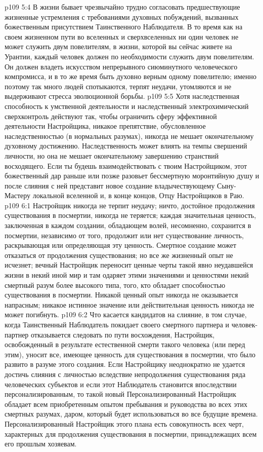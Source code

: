 \vs p109 5:4 \pc В жизни бывает чрезвычайно трудно согласовать предшествующие жизненные устремления с требованиями духовных побуждений, вызванных божественным присутствием Таинственного Наблюдателя. В то время как на своем жизненном пути во вселенных и сверхвселенных ни один человек не может служить двум повелителям, в жизни, которой вы сейчас живете на Урантии, каждый человек должен по необходимости служить двум повелителям. Он должен владеть искусством непрерывного сиюминутного человеческого компромисса, и в то же время быть духовно верным одному повелителю; именно поэтому так много людей спотыкаются, терпят неудачи, утомляются и не выдерживают стресса эволюционной борьбы.
\enlargethispage{\baselineskip}%
\vs p109 5:5 Хотя наследственная способность к умственной деятельности и наследственный электрохимический сверхконтроль действуют так, чтобы ограничить сферу эффективной деятельности Настройщика, никакое препятствие, обусловленное наследственностью (в нормальных разумах), никогда не мешает окончательному духовному достижению. Наследственность может влиять на темпы свершений личности, но она не мешает окончательному завершению странствий восходящего. Если ты будешь взаимодействовать с твоим Настройщиком, этот божественный дар раньше или позже разовьет бессмертную моронтийную душу и после слияния с ней представит новое создание владычествующему Сыну\hyp{}Мастеру локальной вселенной и, в конце концов, Отцу Настройщиков в Раю.
\vs p109 6:1 Настройщик никогда не терпит неудачу; ничто, достойное продолжения существования в посмертии, никогда не теряется; каждая значительная ценность, заключенная в каждом создании, обладающем волей, несомненно, сохранится в посмертии, независимо от того, продолжит или нет существование личность, раскрывающая или определяющая эту ценность. Смертное создание может отказаться от продолжения существования; но все же жизненный опыт не исчезнет; вечный Настройщик переносит ценные черты такой явно неудавшейся жизни в некий иной мир и там одаряет этими значениями и ценностями некий смертный разум более высокого типа, того, кто обладает способностью существования в посмертии. Никакой ценный опыт никогда не оказывается напрасным; никакое истинное значение или действительная ценность никогда не может погибнуть.
\vs p109 6:2 Что касается кандидатов на слияние, в том случае, когда Таинственный Наблюдатель покидает своего смертного партнера и человек\hyp{}партнер отказывается следовать по пути восхождения, Настройщик, освобожденный в результате естественной смерти такого человека (или перед этим), уносит все, имеющее ценность для существования в посмертии, что было развито в разуме этого создания. Если Настройщику неоднократно не удается достичь слияния с личностью вследствие непродолжения существования ряда человеческих субъектов и если этот Наблюдатель становится впоследствии персонализированным, то такой новый Персонализированный Настройщик обладает всем приобретенным опытом пребывания и руководства во всех этих смертных разумах, даром, который будет использоваться во все будущие времена. Персонализированный Настройщик этого плана есть совокупность всех черт, характерных для продолжения существования в посмертии, принадлежащих всем его прошлым хозяевам.
